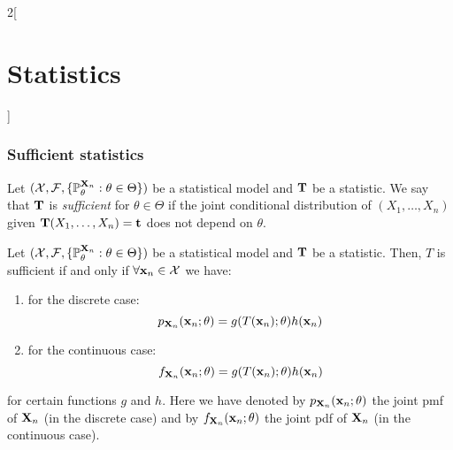 \documentclass[../../../main.tex]{subfiles}
\begin{document}
\begin{multicols}{2}[\section{Statistics}]
  \subsubsection{Sufficient statistics}
  \begin{definition}
    Let $(\mathcal{X},\mathcal{F},\{\mathbb{P}_\theta^{\boldsymbol{\mathrm{X}}_n}:\theta\in\Theta\})$ be a statistical model and $\boldsymbol{\mathrm{T}}$ be a statistic. We say that $\boldsymbol{\mathrm{T}}$ is \emph{sufficient} for $\theta\in\Theta$ if the joint conditional distribution of $(X_1,\ldots,X_n)$ given $\boldsymbol{\mathrm{T}}(X_1,\ldots,X_n)=\boldsymbol{\mathrm{t}}$ does not depend on $\theta$.
  \end{definition}
  \begin{theorem}
    Let $(\mathcal{X},\mathcal{F},\{\mathbb{P}_\theta^{\boldsymbol{\mathrm{X}}_n}:\theta\in\Theta\})$ be a statistical model and $\boldsymbol{\mathrm{T}}$ be a statistic. Then, $T$ is sufficient if and only if $\forall \boldsymbol{\mathrm{x}}_n\in\mathcal{X}$ we have:
    \begin{enumerate}
      \item for the discrete case: $$p_{\boldsymbol{\mathrm{X}}_n}(\boldsymbol{\mathrm{x}}_n;\theta)=g(T(\boldsymbol{\mathrm{x}}_n);\theta)h(\boldsymbol{\mathrm{x}}_n)$$
      \item for the continuous case:  $$f_{\boldsymbol{\mathrm{X}}_n}(\boldsymbol{\mathrm{x}}_n;\theta)=g(T(\boldsymbol{\mathrm{x}}_n);\theta)h(\boldsymbol{\mathrm{x}}_n)$$
    \end{enumerate}
    for certain functions $g$ and $h$. Here we have denoted by $p_{\boldsymbol{\mathrm{X}}_n}(\boldsymbol{\mathrm{x}}_n;\theta)$ the joint pmf of $\boldsymbol{\mathrm{X}}_n$ (in the discrete case) and by $f_{\boldsymbol{\mathrm{X}}_n}(\boldsymbol{\mathrm{x}}_n;\theta)$ the joint pdf of $\boldsymbol{\mathrm{X}}_n$ (in the continuous case).
  \end{theorem}

\end{multicols}
\end{document}
